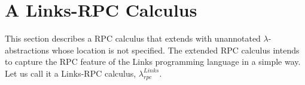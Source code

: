 \documentclass[a4paper]{article}
\theoremstyle{plain}
\newtheorem{corollary}[theorem]{Corollary}
\theoremstyle{definition}
\newcommand{\linksrpc}{$\lambda_{rpc}^{Links}$\xspace}
\begin{document}
	




	
\section{A Links-RPC Calculus}
\label{sec:linksrpc}

This section describes a RPC calculus that extends with unannotated
$\lambda$-abstractions whose location is not specified.
%
The extended RPC calculus intends to capture the RPC feature of the
Links programming language \cite{Cooper:2006:LWP:1777707.1777724} in a
simple way.
%
Let us call it a Links-RPC calculus, \linksrpc.
\end{document}
